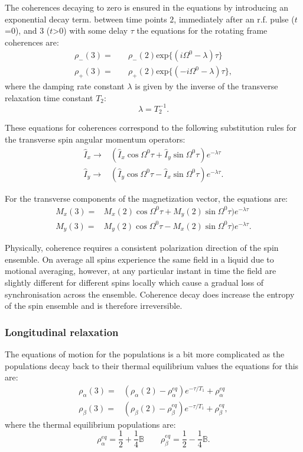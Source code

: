 The coherences decaying to zero is ensured in the equations by introducing an exponential decay term.
between time points $2$, immediately after an r.f. pulse ($t$=0), and $3$ ($t$>0) with some delay $\tau$ the
equations for the rotating frame coherences are:
\begin{align}\label{eqn:coherencetime}
  \rho_-(3) =&\quad \rho_-(2)\text{exp}\{(i\Omega^0 - \lambda)\tau\}\\
  \rho_+(3) =&\quad \rho_+(2)\text{exp}\{(-i\Omega^0 - \lambda)\tau\},
\end{align}
where the damping rate constant $\lambda$ is given by the inverse of the
transverse relaxation time constant $T_2$:
\begin{equation}
  \lambda = T_2^{-1}.
\end{equation}

These equations for coherences correspond to the following substitution rules
for the transverse spin angular momentum operators:
\begin{align}
  \hat{I}_x \rightarrow& (\hat{I}_x\cos\Omega^0\tau + \hat{I}_y\sin\Omega^0\tau)e^{-\lambda\tau}\\
  \hat{I}_y \rightarrow& (\hat{I}_y\cos\Omega^0\tau - \hat{I}_x\sin\Omega^0\tau)e^{-\lambda\tau}.
\end{align}

For the transverse components of the magnetization vector, the equations are:
\begin{align}
  M_x(3) =& M_x(2)\cos\Omega^0\tau + M_y(2)\sin\Omega^0\tau)e^{-\lambda\tau}\\
  M_y(3) =& M_y(2)\cos\Omega^0\tau - M_x(2)\sin\Omega^0\tau)e^{-\lambda\tau}.
\end{align}

Physically, coherence requires a consistent polarization direction of the spin ensemble. On
average all spins experience the same field in a liquid due to motional averaging, however, at
any particular instant in time the field are slightly different for different spins locally which
cause a gradual loss of synchronisation across the ensemble. Coherence decay does increase the entropy
of the spin ensemble and is therefore irreversible.

\subsubsection{Longitudinal relaxation}

The equations of motion for the populations is a bit more complicated as the populations decay back
to their thermal equilibrium values the equations for this are:
\begin{align}
  \rho_\alpha(3) =& (\rho_\alpha(2)-\rho_\alpha^{eq})e^{-\tau/T_1} + \rho_\alpha^{eq} \\
  \rho_\beta(3) =& (\rho_\beta(2)-\rho_\beta^{eq})e^{-\tau/T_1} + \rho_\beta^{eq},
\end{align}
where the thermal equilibrium populations are:
\begin{equation}
  \rho_\alpha^{eq} = \frac{1}{2} + \frac{1}{4}\mathbb{B} \qquad \rho_\beta^{eq} = \frac{1}{2} - \frac{1}{4}\mathbb{B}.
\end{equation}


